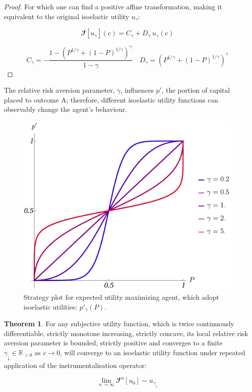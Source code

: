 \documentclass{article}
\theoremstyle{definition}
\newtheorem{theorem}{Theorem}[section]
\begin{document}
\begin{proof}
    For which one can find a positive affine transformation, making it equivalent to the original isoelastic utility $u_\gamma$:

    \begin{equation}
        \mathbfcal{I}[u_\gamma](c) = C_\gamma + D_\gamma \ u_\gamma(c)
    \end{equation}
    
    \begin{equation}
        C_\gamma = - \frac{1-\left ( P^{1/\gamma} + (1-P)^{1/\gamma} \right )^\gamma}{1-\gamma}
        \quad
        D_\gamma = \left ( P^{1/\gamma} + (1-P)^{1/\gamma} \right )^\gamma
    \end{equation}
\end{proof}

The relative risk aversion parameter, $\gamma$, influences $p'$, the portion of capital placed to outcome A; therefore, different isoelastic utility functions can observably change the agent's behaviour. 

\begin{figure}[H]
    \centering
    \includegraphics[width=10 cm]{img/pp_gamma_P.pdf}
    \caption{Strategy plot for expected utility maximizing agent, which adopt isoelastic utilities: $p'_\gamma(P)$.}
    \label{fig:PolicyPlot_0_gamma}
\end{figure}

\begin{theorem}
    For any subjective utility function, which is twice continuously differentiable, strictly monotone increasing, strictly concave, its local relative risk aversion parameter is bounded, strictly positive and converges to a finite $\gamma_\downarrow \in \mathbb{R}_{>0}$ as $c \to 0$, will converge to an isoelastic utility function under repeated application of the instrumentalisation operator:

    \begin{equation}
        \lim_{n \to \infty} \mathbfcal{I}^n[u_0] \sim u_{\gamma_\downarrow}
    \end{equation}
\end{theorem}
\end{document}
